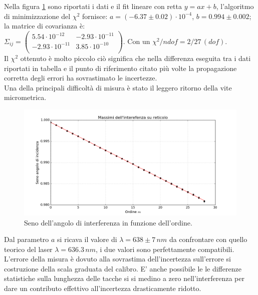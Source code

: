 \documentclass[10pt,a4paper]{article}
\begin{document}
Nella figura \ref{interferenza} sono riportati i dati e il fit lineare con retta $y = ax+b$, l'algoritmo di minimizzazione del $\chi^2$ fornisce: $a = ( -6.37 \pm 0.02 ) \cdot 10^{-4}$, $b = 0.994 \pm 0.002$; la matrice di covarianza è:\\ $ \Sigma_{ij} = \left( \begin{array}{cc}
5.54 \cdot 10^{-12} & -2.93 \cdot 10^{-11} \\ 
-2.93 \cdot 10^{-11} & 3.85 \cdot 10^{-10}\\
\end{array} \right)$. Con un $\chi^2/ndof = 2/27 \, (dof)$.\\
Il $\chi^2$ ottenuto è molto piccolo ciò significa che nella differenza eseguita tra i dati riportati in tabella e il punto di riferimento citato più volte la propagazione corretta degli errori ha sovrastimato le incertezze.\\
Una della principali difficoltà di misura è stato il leggero ritorno della vite micrometrica.\\


\begin{figure}[!htb]
  \centering
  \includegraphics[scale=.5]{plot.png}
\caption{Seno dell'angolo di interferenza in funzione dell'ordine.}
\label{interferenza}
\end{figure}

Dal parametro $a$ si ricava il valore di $\lambda = 638 \pm 7 \, nm$ da confrontare con quello teorico del laser $\lambda = 636.3 \, nm$, i due valori sono perfettamente compatibili. L'errore della misura è dovuto alla sovrastima dell'incertezza sull'errore si costruzione della scala graduata del calibro. E' anche possibile le le differenze statistiche sulla lunghezza delle tacche si si medino a zero nell'interferenza per dare un contributo effettivo all'incertezza drasticamente ridotto.\\
\end{document}
